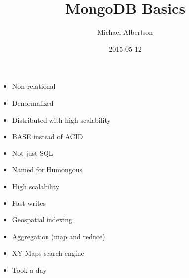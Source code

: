 \documentclass{beamer}
\title{MongoDB Basics}
\author{Michael Albertson}
\date{2015-05-12}%
\begin{document}
\begin{frame}%

\maketitle

\end{frame}


\begin{frame}%

\begin{itemize}
\item Non-relational
\item Denormalized
\item Distributed with high scalability
\item BASE instead of ACID %
\item Not just SQL
\end{itemize}

\end{frame}


\begin{frame}%

\begin{itemize}
\item Named for Humongous
\item High scalability
\item Fast writes
\item Geospatial indexing
\item Aggregation (map and reduce)
\end{itemize}

\end{frame}




\begin{frame}%

\begin{itemize}
\item XY Maps search engine
\item Took a day
\end{itemize}


\end{frame}
\end{document}
